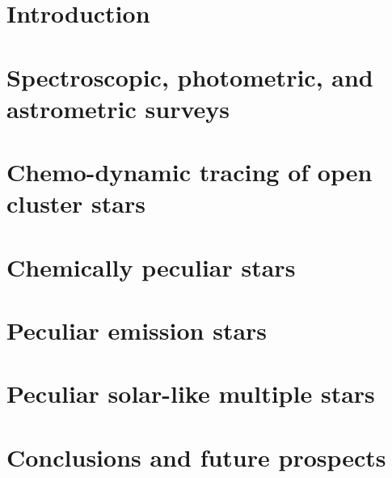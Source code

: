 \pagestyle{fancy}
\fancyhead[CE,RE]{}
\fancyhead[LO,CO]{}
\fancyhead[LE]{\textbf{\nouppercase{\leftmark}}}
\fancyhead[RO]{\textbf{\nouppercase{\rightmark}}}


\chapter{Introduction}
\label{chap:intro}


\chapter{Spectroscopic, photometric, and astrometric surveys}
\label{chap:surveys}


\chapter{Chemo-dynamic tracing of open cluster stars}
\label{chap:clusters}


\chapter{Chemically peculiar stars}
\label{chap:peculiars_chem}


\chapter{Peculiar emission stars}
\label{chap:peculiars_emis}


\chapter{Peculiar solar-like multiple stars}
\label{chap:twins}


\chapter{Conclusions and future prospects}
\label{chap:conclusion}




\cleardoublepage{}
\renewcommand\bibname{Bibliography}




